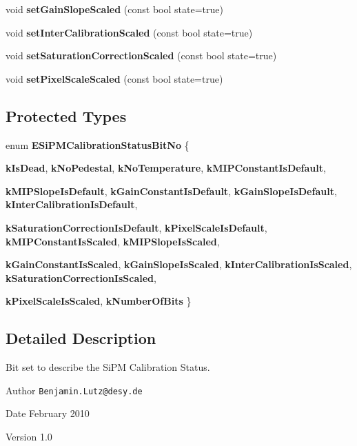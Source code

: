 \begin{DoxyCompactItemize}
\item 
void {\bfseries setGainSlopeScaled} (const bool state=true)\label{classCALICE_1_1SiPMCalibrationStatusBits_a10088c8f481ba4f08cb9a6028af80263}

\item 
void {\bfseries setInterCalibrationScaled} (const bool state=true)\label{classCALICE_1_1SiPMCalibrationStatusBits_a21bdee55388a7fdc76cd10167d017649}

\item 
void {\bfseries setSaturationCorrectionScaled} (const bool state=true)\label{classCALICE_1_1SiPMCalibrationStatusBits_a10c7bf85262f71b771a11a31795355b9}

\item 
void {\bfseries setPixelScaleScaled} (const bool state=true)\label{classCALICE_1_1SiPMCalibrationStatusBits_a65b0ac5ea727b7c58c939934b8b68c9f}

\end{DoxyCompactItemize}
\subsection*{Protected Types}
\begin{DoxyCompactItemize}
\item 
enum {\bf ESiPMCalibrationStatusBitNo} \{ \par
{\bf kIsDead}, 
{\bf kNoPedestal}, 
{\bf kNoTemperature}, 
{\bf kMIPConstantIsDefault}, 
\par
{\bf kMIPSlopeIsDefault}, 
{\bf kGainConstantIsDefault}, 
{\bf kGainSlopeIsDefault}, 
{\bf kInterCalibrationIsDefault}, 
\par
{\bf kSaturationCorrectionIsDefault}, 
{\bf kPixelScaleIsDefault}, 
{\bf kMIPConstantIsScaled}, 
{\bf kMIPSlopeIsScaled}, 
\par
{\bf kGainConstantIsScaled}, 
{\bf kGainSlopeIsScaled}, 
{\bf kInterCalibrationIsScaled}, 
{\bf kSaturationCorrectionIsScaled}, 
\par
{\bf kPixelScaleIsScaled}, 
{\bfseries kNumberOfBits}
 \}
\end{DoxyCompactItemize}


\subsection{Detailed Description}
Bit set to describe the SiPM Calibration Status. \begin{DoxyAuthor}{Author}
{\tt Benjamin.Lutz@desy.de} 
\end{DoxyAuthor}
\begin{DoxyDate}{Date}
February 2010 
\end{DoxyDate}
\begin{DoxyVersion}{Version}
1.0 
\end{DoxyVersion}


